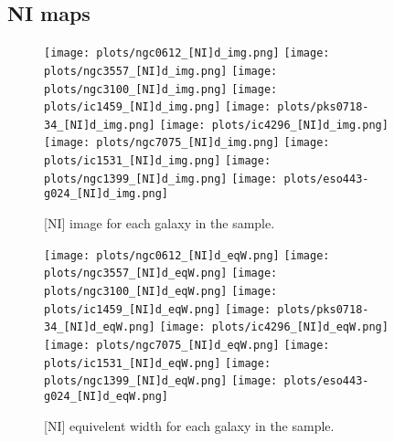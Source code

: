 \documentclass[fleqn,usenatbib,useAMS]{mnras}
\begin{document}
    \subsection{NI maps}
        \label{subsec:NImaps}
        \begin{figure*}
            \centering
            \texttt{[image: plots/ngc0612\_[NI]d\_img.png]}
            \texttt{[image: plots/ngc3557\_[NI]d\_img.png]}
            \texttt{[image: plots/ngc3100\_[NI]d\_img.png]}
            \texttt{[image: plots/ic1459\_[NI]d\_img.png]}
            \texttt{[image: plots/pks0718-34\_[NI]d\_img.png]}
            \texttt{[image: plots/ic4296\_[NI]d\_img.png]}
            \texttt{[image: plots/ngc7075\_[NI]d\_img.png]}
            \texttt{[image: plots/ic1531\_[NI]d\_img.png]}
            \texttt{[image: plots/ngc1399\_[NI]d\_img.png]}
            \texttt{[image: plots/eso443-g024\_[NI]d\_img.png]}
            \caption{[NI] image for each galaxy in the sample.}
            \label{fig:NI_img}
        \end{figure*}


        \begin{figure*}
            \centering
            \texttt{[image: plots/ngc0612\_[NI]d\_eqW.png]}
            \texttt{[image: plots/ngc3557\_[NI]d\_eqW.png]}
            \texttt{[image: plots/ngc3100\_[NI]d\_eqW.png]}
            \texttt{[image: plots/ic1459\_[NI]d\_eqW.png]}
            \texttt{[image: plots/pks0718-34\_[NI]d\_eqW.png]}
            \texttt{[image: plots/ic4296\_[NI]d\_eqW.png]}
            \texttt{[image: plots/ngc7075\_[NI]d\_eqW.png]}
            \texttt{[image: plots/ic1531\_[NI]d\_eqW.png]}
            \texttt{[image: plots/ngc1399\_[NI]d\_eqW.png]}
            \texttt{[image: plots/eso443-g024\_[NI]d\_eqW.png]}
            \caption{[NI] equivelent width for each galaxy in the sample.}
            \label{fig:NI_eqW}
        \end{figure*}
\end{document}

